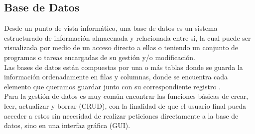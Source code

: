 


\subsection{Base de Datos}

Desde un punto de vista informático, una base de datos es un sistema estructurado de información almacenada y relacionada entre sí, la cual puede ser visualizada por medio de un acceso directo a ellas o teniendo un conjunto de programas o tareas encargadas de su gestión y/o modificación.\\

Las bases de datos están compuestas por una o más tablas donde se guarda la información ordenadamente en filas y columnas, donde se encuentra cada elemento que queramos guardar junto con su correspondiente registro \cite{DB}.\\ 

Para la gestión de datos es muy común encontrar las funciones básicas de crear, leer, actualizar y borrar (CRUD), con la finalidad de que el usuario final pueda acceder a estos sin necesidad de realizar peticiones directamente a la base de datos, sino en una interfaz gráfica (GUI).\\


%
%

